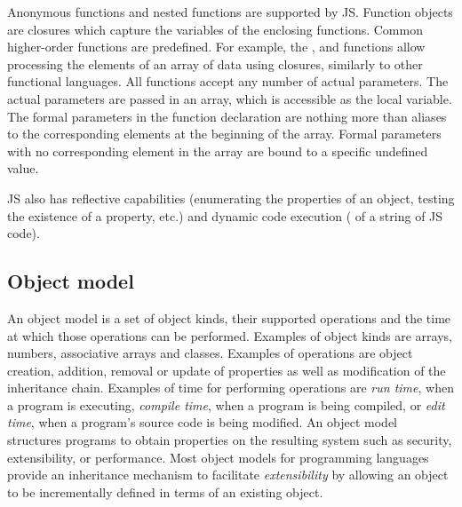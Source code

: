 Anonymous functions and nested functions are supported by JS. Function objects
are closures which capture the variables of the enclosing functions. Common
higher-order functions are predefined. For example, the , 
and  functions allow processing the elements of an array of data
using closures, similarly to other functional languages. All functions accept
any number of actual parameters. The actual parameters are passed in an array,
which is accessible as the  local variable. The formal parameters
in the function declaration are nothing more than aliases to the corresponding
elements at the beginning of the array. Formal parameters with no corresponding
element in the array are bound to a specific undefined value.

JS also has reflective capabilities (enumerating the properties of an object,
testing the existence of a property, etc.) and dynamic code execution
( of a string of JS code).  


\subsection{Object model}

An object model is a set of object kinds, their supported operations and the
time at which those operations can be performed.  Examples of object kinds are
arrays, numbers, associative arrays and classes.  Examples of operations are
object creation, addition, removal or update of properties as well as
modification of the inheritance chain. Examples of time for performing
operations are \textit{run time}, when a program is executing, \textit{compile
time}, when a program is being compiled, or \textit{edit time}, when a program's
source code is being modified. An object model structures programs to obtain
properties on the resulting system such as security, extensibility, or
performance. Most object models for programming languages provide an
inheritance mechanism to facilitate \textit{extensibility} by allowing an object
to be incrementally defined in terms of an existing object.

